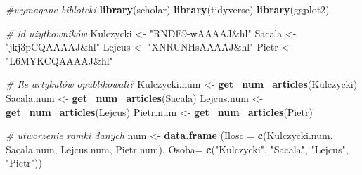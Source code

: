 \documentclass[
  12pt,
]{article}
\newenvironment{Shaded}{\begin{snugshade}}{\end{snugshade}}
\newcommand{\AttributeTok}[1]{\textcolor[rgb]{0.13,0.29,0.53}{#1}}
\newcommand{\CommentTok}[1]{\textcolor[rgb]{0.56,0.35,0.01}{\textit{#1}}}
\newcommand{\FunctionTok}[1]{\textcolor[rgb]{0.13,0.29,0.53}{\textbf{#1}}}
\newcommand{\NormalTok}[1]{#1}
\newcommand{\OtherTok}[1]{\textcolor[rgb]{0.56,0.35,0.01}{#1}}
\newcommand{\StringTok}[1]{\textcolor[rgb]{0.31,0.60,0.02}{#1}}
\begin{document}
\begin{Shaded}
\begin{Highlighting}[]
\CommentTok{\#wymagane bibloteki}
\FunctionTok{library}\NormalTok{(scholar)}
\FunctionTok{library}\NormalTok{(tidyverse)}
\FunctionTok{library}\NormalTok{(ggplot2)}

\CommentTok{\# id  użytkowników}
\NormalTok{Kulczycki }\OtherTok{\textless{}{-}} \StringTok{"RNDE9{-}wAAAAJ\&hl"}  
\NormalTok{Sacala }\OtherTok{\textless{}{-}} \StringTok{"jkj3pCQAAAAJ\&hl"} 
\NormalTok{Lejcus }\OtherTok{\textless{}{-}} \StringTok{"XNRUNHsAAAAJ\&hl"} 
\NormalTok{Pietr }\OtherTok{\textless{}{-}} \StringTok{"L6MYKCQAAAAJ\&hl"} 

\CommentTok{\# Ile artykułów opublikowali?}
\NormalTok{Kulczycki.num }\OtherTok{\textless{}{-}} \FunctionTok{get\_num\_articles}\NormalTok{(Kulczycki)}
\NormalTok{Sacala.num }\OtherTok{\textless{}{-}} \FunctionTok{get\_num\_articles}\NormalTok{(Sacala)}
\NormalTok{Lejcus.num }\OtherTok{\textless{}{-}} \FunctionTok{get\_num\_articles}\NormalTok{(Lejcus)}
\NormalTok{Pietr.num }\OtherTok{\textless{}{-}} \FunctionTok{get\_num\_articles}\NormalTok{(Pietr)}

\CommentTok{\# utworzenie ramki danych}
\NormalTok{num }\OtherTok{\textless{}{-}} \FunctionTok{data.frame}\NormalTok{ (}\AttributeTok{Ilosc =} \FunctionTok{c}\NormalTok{(Kulczycki.num, }
\NormalTok{                              Sacala.num, }
\NormalTok{                              Lejcus.num, }
\NormalTok{                              Pietr.num),}
                  \AttributeTok{Osoba=} \FunctionTok{c}\NormalTok{(}\StringTok{"Kulczycki"}\NormalTok{, }\StringTok{"Sacala"}\NormalTok{, }\StringTok{"Lejcus"}\NormalTok{, }\StringTok{"Pietr"}\NormalTok{))}


\end{Highlighting}
\end{Shaded}
\end{document}
